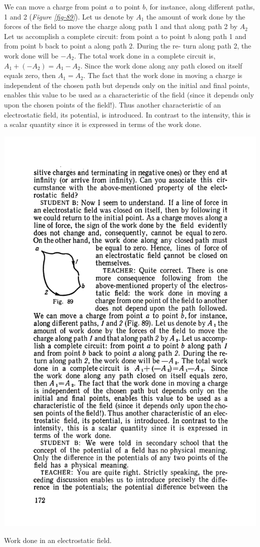 \documentclass[a4paper,sfsidenotes]{tufte-book}
\begin{document}
We can move a charge from point $a$ to point $b$, for instance, along different paths, 1 and 2 (\emph{Figure \ref{fig-89}}). Let us denote by $A_{1}$ the amount of work done by the forces of the field to move the charge along path 1 and that along path 2 by $A_{2}$ Let us accomplish a complete circuit: from point a to point b along path 1 and from point b back to point a along path 2. During the re- turn along path 2, the work done will be $-A_{2}$. The total work done in a complete circuit is, $A_{1}+ (-A_{2})=A_{1}-A_{2}$. Since the work done along any path closed on itself equals zero, then $A_{1}=A_{2}$. The fact that the work done in moving a charge is independent of the chosen path but depends only on the initial and final points, enables this value to be used as a characteristic of the field (since it depends only upon the chosen points of the field!). Thus another characteristic of an electrostatic field, its potential, is introduced. In contrast to the intensity, this is a scalar quantity since it is expressed in terms of the work done.
\\
\begin{marginfigure}%
\centering
\includegraphics[width=.7\linewidth]{fig-089a}
\caption{Work done in an electrostatic field.}
\label{fig-89}
\end{marginfigure}
\end{document}
